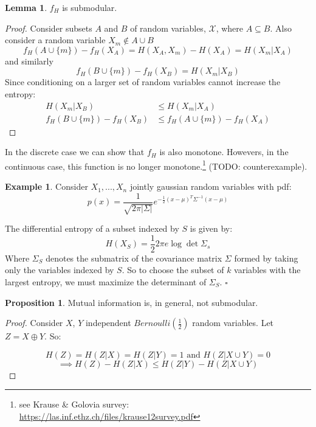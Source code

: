 \documentclass[twoside]{article}
\newcommand*{\QEDB}{\hfill\ensuremath{\square}}%
\newcommand*\xor{\mathbin{\oplus}}
\theoremstyle{definition}
\newtheorem{example}{Example}
\newtheorem{lemma}[theorem]{Lemma}
\newtheorem{proposition}[theorem]{Proposition}
\newtheorem{note}{Note}
\begin{document}
\begin{lemma}
$f_H$ is submodular.
\end{lemma}

\begin{proof}
  Consider subsets $A$ and $B$ of random variables,
  $\mathcal{X}$, where $A \subseteq B$. Also consider a random
  variable $X_m \notin A \cup B$
  $$f_H(A \cup \{m\}) - f_H(X_A) = H(X_A, X_m) - H(X_A) = H(X_m | X_A)$$
  \centering and similarly
  $$f_H(B \cup \{m\}) - f_H(X_B) = H(X_m | X_B)$$
  Since conditioning on a larger set of random variables cannot
  increase the entropy:
  \begin{align*}
    H(X_m | X_B) & \leq H(X_m | X_A) \\
    f_H(B \cup \{m\}) - f_H(X_B) & \leq f_H(A \cup \{m\}) - f_H(X_A)
  \end{align*}
\end{proof}


In the discrete case we can show that $f_H$ is also monotone. Howevers,
in the continuous case, this function is no longer
monotone.\footnote{see Krause \& Golovia survey:
  \href{https://las.inf.ethz.ch/files/krause12survey.pdf}{https://las.inf.ethz.ch/files/krause12survey.pdf}}
(TODO: counterexample).

\begin{example}
  Consider $X_1, ..., X_n$ jointly gaussian random variables with pdf:
  $$p(x) = \frac{1}{\sqrt{2\pi |\Sigma|}} e^{-\frac{1}{2}(x-\mu)^T
    \Sigma^{-1} (x-\mu)}$$

  The differential entropy of a subset indexed by $S$ is given by:
  $$H(X_S) = \frac{1}{2} 2 \pi e\log \det \Sigma_s$$
  Where $\Sigma_S$ denotes the submatrix of the covariance matrix
  $\Sigma$ formed by taking only the variables indexed by $S$. So to
  choose the subset of $k$ variables with the largest entropy, we must
  maximize the determinant of $\Sigma_S$.
  \QEDB
\end{example}

\begin{proposition}
  Mutual information is, in general, not submodular.
\end{proposition}
\begin{proof}
  Consider $X$, $Y$
  independent $Bernoulli(\frac{1}{2})$ random variables. Let $Z = X
  \xor Y$. So:

  $$H(Z) = H (Z | X) = H (Z | Y) = 1  \text{ and } H (Z | X \cup Y) = 0$$
  $$\implies H(Z) - H(Z | X) \leq H (Z | Y) - H (Z | X \cup Y)$$
\end{proof}
\end{document}
